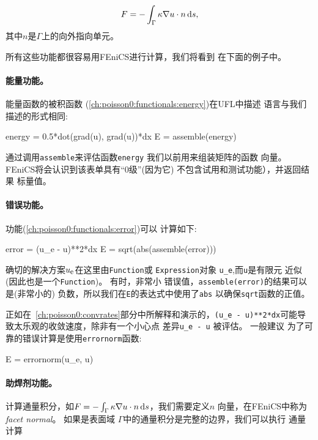 \begin{equation}
F = -\int_\Gamma \kappa\nabla u\cdot n \, \mathrm{d}s,
\label{ch:poisson0:functionals:flux}
\end{equation}
其中$n$是$\Gamma$上的向外指向单元。

所有这些功能都很容易用FEniCS进行计算，我们将看到
在下面的例子中。


\paragraph{能量功能。}
能量函数的被积函数
(\ref{ch:poisson0:functionals:energy})在UFL中描述
语言与我们描述的形式相同:

\begin{python}
energy = 0.5*dot(grad(u), grad(u))*dx
E = assemble(energy)
\end{python}
通过调用\texttt{assemble}来评估函数\texttt{energy}
我们以前用来组装矩阵的函数
向量。 FEniCS将会认识到该表单具有“0级”(因为它)
不包含试用和测试功能），并返回结果
标量值。


\paragraph{错误功能。}
功能(\ref{ch:poisson0:functionals:error})可以
计算如下:

\begin{python}
error = (u_e - u)**2*dx
E = sqrt(abs(assemble(error)))
\end{python}
确切的解决方案$u_{\mbox{\footnotesize e}}$在这里由\texttt{Function}或
\texttt{Expression}对象
\verb!u_e!,而\texttt{u}是有限元
近似(因此也是一个\texttt{Function})。 有时，非常小
错误值，\texttt{assemble(error)}的结果可以是(非常小的)
负数，所以我们在\texttt{E}的表达式中使用了\texttt{abs}
以确保\texttt{sqrt}函数的正值。


正如在~\ref{ch:poisson0:convrates}部分中所解释和演示的，\verb!(u_e - u)**2*dx!可能导致太乐观的收敛速度，除非有一个小心点
差异\verb!u_e - u! 被评估。 一般建议
为了可靠的错误计算是使用\texttt{errornorm}函数:

\begin{python}
E = errornorm(u_e, u)
\end{python}


\paragraph{助焊剂功能。}
计算通量积分，如$F = -\int_\Gamma \kappa\nabla
u\cdot n \, \mathrm{d}s$，我们需要定义$n$
向量，在FEniCS中称为\emph{facet normal}。 如果是表面域
$\Gamma$中的通量积分是完整的边界，我们可以执行
通量计算

